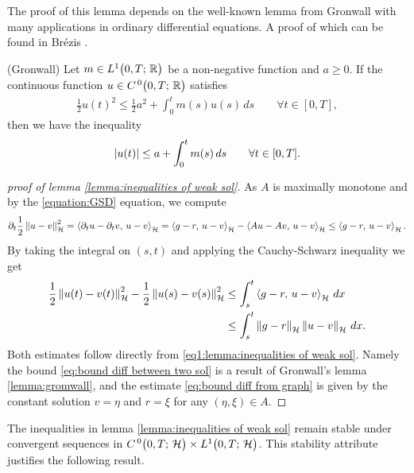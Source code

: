 The proof of this lemma depends on the well-known lemma from
Gronwall with many applications in ordinary differential equations.
A proof of which can be found in Brézis
\cite[Lemma A.5]{brezis1973ope}. 
\begin{lemma}\label{lemma:gromwall}
	{\selectfont(Gronwall)}
	Let $ m\in L^{1}\big(0,T;\,\mathbb{R}\big) $ be a non-negative function and $ a\geq 0 $. 
	If the continuous function 
	$ u\in C^{\, 0}\big(0,T;\,\mathbb{R}\big) $
	satisfies
	\begin{align*}
		\frac{1}{2}u(t)^2\leq\frac{1}{2}a^2+\int_0^t m(s) u(s)\,ds
		\qquad\forall t\in[0,T],
	\end{align*}
	then we have the inequality
	\begin{align*}
		\left\vert u(t)\right\vert\leq a+\int_0^t m(s)\,ds
		\qquad\forall t\in[0,T].
	\end{align*}
\end{lemma}

\begin{proof}[proof of lemma \ref{lemma:inequalities of weak sol}]
	As $  A $ is maximally monotone and by the \ref{equation:GSD} equation, 
	we compute
	\begin{align*}
		\partial_t \frac{1}{2}\left\Vert u-v\right\Vert_{\mathcal{H}}^2
		=\left\langle \partial_t u-\partial_t v,\,u-v\right\rangle_{\mathcal{H}}
		=\left\langle g-r,\,u-v\right\rangle_{\mathcal{H}}
		-\left\langle A u- A v,\,u-v\right\rangle_{\mathcal{H}}
		\leq \left\langle g-r,\,u-v\right\rangle_{\mathcal{H}}.
	\end{align*}
	By taking the integral on $ (s,t) $ 
	and applying the Cauchy-Schwarz inequality we get
	\begin{align}\label{eq1:lemma:inequalities of weak sol}
		\begin{split}
			\frac{1}{2}\left\Vert u(t)-v(t)\right\Vert_{\mathcal{H}}^2
			-\frac{1}{2}\left\Vert u(s)-v(s)\right\Vert_{\mathcal{H}}^2
			&\leq \int_s^t \left\langle g-r,\,u-v\right\rangle_{\mathcal{H}}\,dx\\
			&\leq \int_s^t \left\Vert g-r\right\Vert_{\mathcal{H}}\left\Vert u-v\right\Vert_{\mathcal{H}}\,dx.
		\end{split}
	\end{align}
	Both estimates follow directly from 
	\eqref{eq1:lemma:inequalities of weak sol}. Namely the bound
	\eqref{eq:bound diff between two sol} is a result of 
	Gronwall's lemma \ref{lemma:gromwall}, and the estimate 
	\eqref{eq:bound diff from graph} is given by the constant 
	solution $ v=\eta  $
	and $ r = \xi $ for any $ (\eta,\xi)\in A $.
\end{proof}

The inequalities in lemma \ref{lemma:inequalities of weak sol}
remain stable under convergent sequences in $ C^{\, 0}\big(0,T;\,\mathcal{H}\big)\times L^{1}\big(0,T;\,\mathcal{H}\big) $. 
This stability attribute justifies the following result. 

